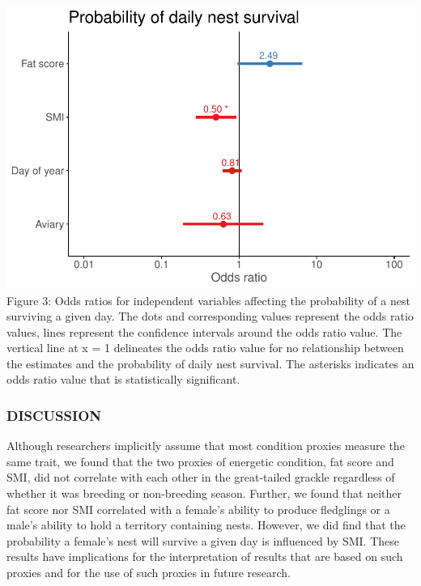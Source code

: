 \documentclass[
]{article}
\begin{document}
\includegraphics{gcondition_files/figure-latex/logexp-1.pdf} Figure 3:
Odds ratios for independent variables affecting the probability of a
nest surviving a given day. The dots and corresponding values represent
the odds ratio values, lines represent the confidence intervals around
the odds ratio value. The vertical line at x = 1 delineates the odds
ratio value for no relationship between the estimates and the
probability of daily nest survival. The asterisks indicates an odds
ratio value that is statistically significant.

\hypertarget{discussion}{%
\subsubsection{DISCUSSION}\label{discussion}}

Although researchers implicitly assume that most condition proxies
measure the same trait, we found that the two proxies of energetic
condition, fat score and SMI, did not correlate with each other in the
great-tailed grackle regardless of whether it was breeding or
non-breeding season. Further, we found that neither fat score nor SMI
correlated with a female's ability to produce fledglings or a male's
ability to hold a territory containing nests. However, we did find that
the probability a female's nest will survive a given day is influenced
by SMI. These results have implications for the interpretation of
results that are based on such proxies and for the use of such proxies
in future research.
\end{document}
